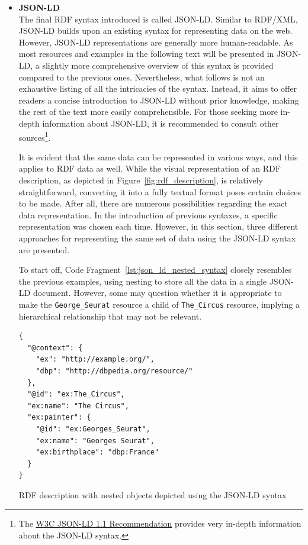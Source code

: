 \begin{itemize}
    \item \textbf{JSON-LD}\\
    The final RDF syntax introduced is called JSON-LD. Similar to RDF/XML, JSON-LD builds upon an existing syntax for representing data on the web. However, JSON-LD representations are generally more human-readable. As most resources and examples in the following text will be presented in JSON-LD, a slightly more comprehensive overview of this syntax is provided compared to the previous ones. Nevertheless, what follows is not an exhaustive listing of all the intricacies of the syntax. Instead, it aims to offer readers a concise introduction to JSON-LD without prior knowledge, making the rest of the text more easily comprehensible. For those seeking more in-depth information about JSON-LD, it is recommended to consult other sources\footnote{The \href{https://www.w3.org/TR/json-ld11/}{W3C JSON-LD 1.1 Recommendation} provides very in-depth information about the JSON-LD syntax.}.

    It is evident that the same data can be represented in various ways, and this applies to RDF data as well. While the visual representation of an RDF description, as depicted in Figure~\ref{fig:rdf_description}, is relatively straightforward, converting it into a fully textual format poses certain choices to be made. After all, there are numerous possibilities regarding the exact data representation. In the introduction of previous syntaxes, a specific representation was chosen each time. However, in this section, three different approaches for representing the same set of data using the JSON-LD syntax are presented.

    To start off, Code Fragment~\ref{lst:json_ld_nested_syntax} closely resembles the previous examples, using nesting to store all the data in a single JSON-LD document. However, some may question whether it is appropriate to make the \texttt{George_Seurat} resource a child of \texttt{The_Circus} resource, implying a hierarchical relationship that may not be relevant.

    \begin{listing}[htbp]
        \begin{verbatim}
{
  "@context": {
    "ex": "http://example.org/",
    "dbp": "http://dbpedia.org/resource/"
  },
  "@id": "ex:The_Circus",
  "ex:name": "The Circus",
  "ex:painter": {
    "@id": "ex:Georges_Seurat",
    "ex:name": "Georges Seurat",
    "ex:birthplace": "dbp:France"
  }
}
        \end{verbatim}
        \caption{RDF description with nested objects depicted using the JSON-LD syntax}
        \label{lst:json_ld_nested_syntax}
    \end{listing}


\end{itemize}
